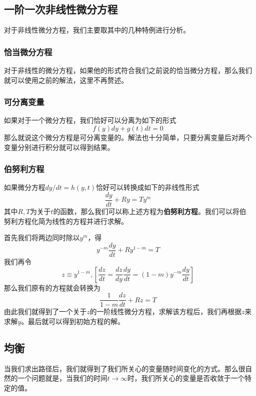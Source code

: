 \documentclass[UTF8,12pt]{ctexart}
\numberwithin{equation}{section} %
\numberwithin{figure}{section}
\numberwithin{table}{section}
\begin{document}
	
	
	
	\subsection{一阶一次非线性微分方程}
	对于非线性微分方程，我们主要取其中的几种特例进行分析。
	\subsubsection{恰当微分方程}
	对于非线性的微分方程，如果他的形式符合我们之前说的恰当微分方程，那么我们就可以使用之前的解法，这里不再赘述。
	
	\subsubsection{可分离变量}
	如果对于一个微分方程，我们恰好可以分离为如下的形式
	\begin{equation}
		f(y) dy + g(t) dt = 0
	\end{equation}
	那么就说这个微分方程是可分离变量的。解法也十分简单，只要分离变量后对两个变量分别进行积分就可以得到结果。
	
	\subsubsection{伯努利方程}
	如果微分方程$dy/dt = h(y,t)$恰好可以转换成如下的非线性形式
	\begin{equation}
		\frac{dy}{dt} + Ry = Ty^m
	\end{equation}
	其中$R,T$为关于$t$的函数，那么我们可以称上述方程为\textbf{伯努利方程}。我们可以将伯努利方程化简为线性的方程并进行求解。
	
	首先我们将两边同时除以$y^m$，得
	\begin{equation}
		y^{-m}\frac{dy}{dt} + Ry^{1-m} = T
	\end{equation}
	我们再令
	\begin{equation}
		z \equiv y^{1-m},[\frac{dz}{dt} = \frac{dz}{dy}\frac{dy}{dt} = (1-m)y^{-m}\frac{dy}{dt}]
	\end{equation}
	那么我们原有的方程就会转换为
	\begin{equation}
		\frac{1}{1-m} \frac{dz}{dt} + Rz = T
	\end{equation}
	由此我们就得到了一个关于$z$的一阶线性微分方程，求解该方程后，我们再根据$z$来求解$y$。最后就可以得到初始方程的解。
	
	\subsection{均衡}
	当我们求出路径后，我们就得到了我们所关心的变量随时间变化的方式。那么很自然的一个问题就是，当我们的时间$t \to \infty$时，我们所关心的变量是否收敛于一个特定的值。
	
\end{document}
